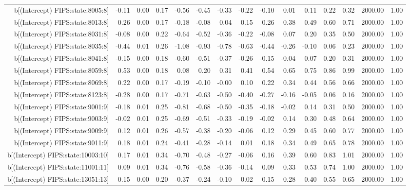 \begin{table}[ht]
\begin{tabular}{rrrrrrrrrrrrrrr}
  b[(Intercept) FIPS:state:8005:8] & -0.11 & 0.00 & 0.17 & -0.56 & -0.45 & -0.33 & -0.22 & -0.10 & 0.01 & 0.11 & 0.22 & 0.32 & 2000.00 & 1.00 \\ 
  b[(Intercept) FIPS:state:8013:8] & 0.26 & 0.00 & 0.17 & -0.18 & -0.08 & 0.04 & 0.15 & 0.26 & 0.38 & 0.49 & 0.60 & 0.71 & 2000.00 & 1.00 \\ 
  b[(Intercept) FIPS:state:8031:8] & -0.08 & 0.00 & 0.22 & -0.64 & -0.52 & -0.36 & -0.22 & -0.08 & 0.07 & 0.20 & 0.35 & 0.50 & 2000.00 & 1.00 \\ 
  b[(Intercept) FIPS:state:8035:8] & -0.44 & 0.01 & 0.26 & -1.08 & -0.93 & -0.78 & -0.63 & -0.44 & -0.26 & -0.10 & 0.06 & 0.23 & 2000.00 & 1.00 \\ 
  b[(Intercept) FIPS:state:8041:8] & -0.15 & 0.00 & 0.18 & -0.60 & -0.51 & -0.37 & -0.26 & -0.15 & -0.04 & 0.07 & 0.20 & 0.31 & 2000.00 & 1.00 \\ 
  b[(Intercept) FIPS:state:8059:8] & 0.53 & 0.00 & 0.18 & 0.08 & 0.20 & 0.31 & 0.41 & 0.54 & 0.65 & 0.75 & 0.86 & 0.99 & 2000.00 & 1.00 \\ 
  b[(Intercept) FIPS:state:8069:8] & 0.22 & 0.00 & 0.17 & -0.19 & -0.10 & -0.00 & 0.10 & 0.22 & 0.34 & 0.44 & 0.56 & 0.66 & 2000.00 & 1.00 \\ 
  b[(Intercept) FIPS:state:8123:8] & -0.28 & 0.00 & 0.17 & -0.71 & -0.63 & -0.50 & -0.40 & -0.27 & -0.16 & -0.05 & 0.06 & 0.16 & 2000.00 & 1.00 \\ 
  b[(Intercept) FIPS:state:9001:9] & -0.18 & 0.01 & 0.25 & -0.81 & -0.68 & -0.50 & -0.35 & -0.18 & -0.02 & 0.14 & 0.31 & 0.50 & 2000.00 & 1.00 \\ 
  b[(Intercept) FIPS:state:9003:9] & -0.02 & 0.01 & 0.25 & -0.69 & -0.51 & -0.33 & -0.19 & -0.02 & 0.14 & 0.30 & 0.48 & 0.64 & 2000.00 & 1.00 \\ 
  b[(Intercept) FIPS:state:9009:9] & 0.12 & 0.01 & 0.26 & -0.57 & -0.38 & -0.20 & -0.06 & 0.12 & 0.29 & 0.45 & 0.60 & 0.77 & 2000.00 & 1.00 \\ 
  b[(Intercept) FIPS:state:9011:9] & 0.18 & 0.01 & 0.24 & -0.41 & -0.28 & -0.14 & 0.01 & 0.18 & 0.34 & 0.49 & 0.65 & 0.78 & 2000.00 & 1.00 \\ 
  b[(Intercept) FIPS:state:10003:10] & 0.17 & 0.01 & 0.34 & -0.70 & -0.48 & -0.27 & -0.06 & 0.16 & 0.39 & 0.60 & 0.83 & 1.01 & 2000.00 & 1.00 \\ 
  b[(Intercept) FIPS:state:11001:11] & 0.09 & 0.01 & 0.34 & -0.76 & -0.58 & -0.36 & -0.14 & 0.09 & 0.33 & 0.53 & 0.74 & 1.00 & 2000.00 & 1.00 \\ 
  b[(Intercept) FIPS:state:13051:13] & 0.15 & 0.00 & 0.20 & -0.37 & -0.24 & -0.10 & 0.02 & 0.15 & 0.28 & 0.40 & 0.55 & 0.65 & 2000.00 & 1.00 \\ 

\end{tabular}
\end{table}
